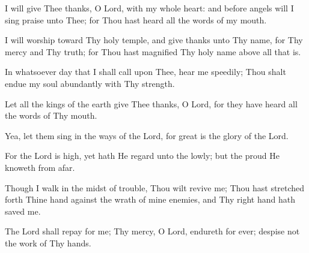 I will give Thee thanks, O Lord, with my whole heart: and before angels will I sing praise unto Thee; for Thou hast heard all the words of my mouth.

I will worship toward Thy holy temple, and give thanks unto Thy name, for Thy mercy and Thy truth; for Thou hast magnified Thy holy name above all that is.

In whatsoever day that I shall call upon Thee, hear me speedily; Thou shalt endue my soul abundantly with Thy strength.

Let all the kings of the earth give Thee thanks, O Lord, for they have heard all the words of Thy mouth.

Yea, let them sing in the ways of the Lord, for great is the glory of the Lord.

For the Lord is high, yet hath He regard unto the lowly; but the proud He knoweth from afar.

Though I walk in the midst of trouble, Thou wilt revive me; Thou hast stretched forth Thine hand against the wrath of mine enemies, and Thy right hand hath saved me.

The Lord shall repay for me; Thy mercy, O Lord, endureth for ever; despise not the work of Thy hands.
